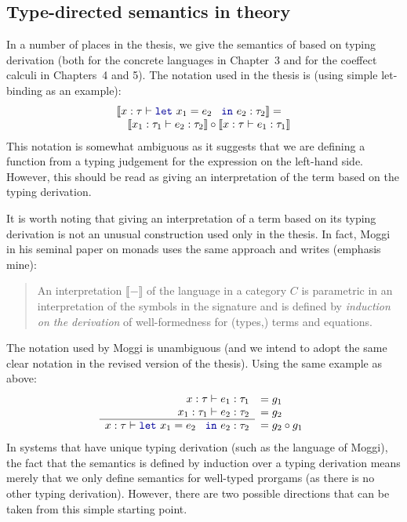 \documentclass[
		twoside,openright,titlepage,numbers=noenddot,headinclude,%
                footinclude=true,cleardoublepage=empty,
                BCOR=10mm,paper=a4,fontsize=10pt, %
                ngerman,american, %
                ]{scrreprt}
\newcommand{\kvd}[1]{\textnormal{\textcolor{kvdclr}{\ttfamily #1}}}
\newcommand{\sem}[1]{\llbracket #1 \rrbracket}
\begin{document}
\subsection{Type-directed semantics in theory}

In a number of places in the thesis, we give the semantics of based on typing derivation (both for
the concrete languages in Chapter~3 and for the coeffect calculi in Chapters~4 and 5). The notation
used in the thesis is (using simple let-binding as an example):
%
\begin{equation*}
\begin{array}{l}
  \sem{x:\tau \vdash \kvd{let}~x_1=e_2~\kvd{in}~e_2 : \tau_2} = \\
  \quad \sem{x_1:\tau_1 \vdash e_2 : \tau_2} \circ \sem{x:\tau \vdash e_1 : \tau_1}
\end{array}
\end{equation*}
%
This notation is somewhat ambiguous as it suggests that we are defining a function from a typing
judgement for the expression on the left-hand side. However, this should be read as giving an
interpretation of the term based on the typing derivation.

It is worth noting that giving an interpretation of a term based on its typing derivation is not
an unusual construction used only in the thesis. In fact, Moggi in his seminal paper on monads uses
the same approach and writes \cite[p7]{monad-notions} (emphasis mine):

\begin{quotation}
\noindent
An interpretation $\sem{-}$ of the language in a category $C$ is parametric in an interpretation
of the symbols in the signature and is defined by \emph{induction on the derivation} of
well-formedness for (types,) terms and equations.
\end{quotation}

\noindent
The notation used by Moggi is unambiguous (and we intend to adopt the same clear notation in the
revised version of the thesis). Using the same example as above:
%
\begin{equation*}
  \begin{array}{r}
    x:\tau \vdash e_1 : \tau_1 \\
    x_1:\tau_1 \vdash e_2 : \tau_2 \\ \hline
    x:\tau \vdash \kvd{let}~x_1=e_2~\kvd{in}~e_2 : \tau_2
  \end{array}
  \begin{array}{l}
    = g_1 \\
    = g_2 \\
    = g_2 \circ g_1
  \end{array}
\end{equation*}
%
In systems that have unique typing derivation (such as the language of Moggi), the fact that the
semantics is defined by induction over a typing derivation means merely that we only define
semantics for well-typed prorgams (as there is no other typing derivation). However, there are two
possible directions that can be taken from this simple starting point.
\end{document}
